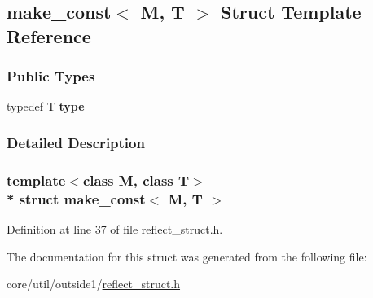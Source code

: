 \hypertarget{structmake__const}{}\subsection{make\+\_\+const$<$ M, T $>$ Struct Template Reference}
\label{structmake__const}
\subsubsection*{Public Types}
\begin{DoxyCompactItemize}
\item 
typedef T {\bfseries type}\hypertarget{structmake__const_a299fb271461b6d9d20dbe01f85ac52c4}{}\label{structmake__const_a299fb271461b6d9d20dbe01f85ac52c4}

\end{DoxyCompactItemize}


\subsubsection{Detailed Description}
\subsubsection*{template$<$class M, class T$>$\\*
struct make\+\_\+const$<$ M, T $>$}



Definition at line 37 of file reflect\+\_\+struct.\+h.



The documentation for this struct was generated from the following file\+:\begin{DoxyCompactItemize}
\item 
core/util/outside1/\hyperlink{reflect__struct_8h}{reflect\+\_\+struct.\+h}\end{DoxyCompactItemize}
